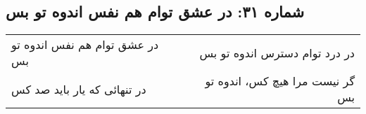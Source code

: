 \begin{center}
\section*{شماره ۳۱: در عشق توام هم نفس اندوه تو بس}
\label{sec:031}
\begin{longtable}{l p{0.5cm} r}
در عشق توام هم نفس اندوه تو بس
&&
در درد توام دسترس اندوه تو بس
\\
در تنهائی که یار باید صد کس
&&
گر نیست مرا هیچ کس، اندوه تو بس
\\
\end{longtable}
\end{center}
